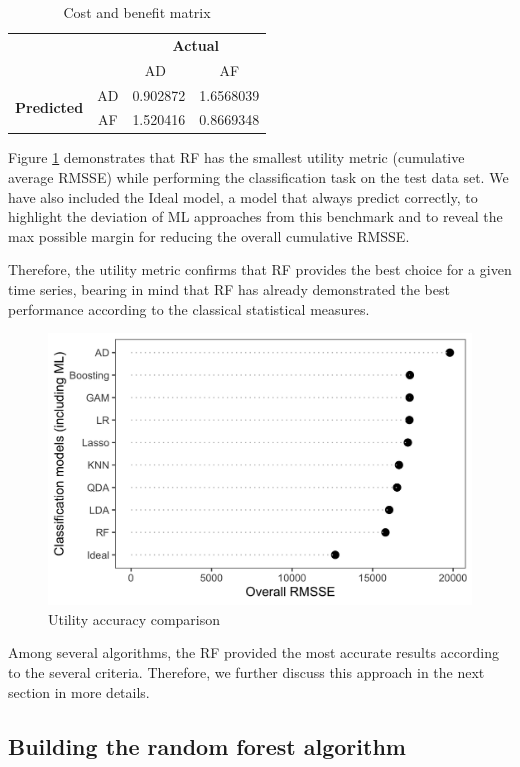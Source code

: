 \documentclass[preprint, 3p,
authoryear]{elsarticle} %
\begin{document}
\begin{table}
\caption{\label{tab:matrix}Cost and benefit matrix}
\centering
\begin{tabular}[t]{lccc}

\multicolumn{2}{c}{} & \multicolumn{2}{c}{\bf Actual}\\ 
\cline{3-4}
& & AD\  & AF\\
\hline
\multirow{2}{4em}{\bf Predicted} & AD & 0.902872 & 1.6568039\\
& AF & 1.520416 & 0.8669348\\
\hline
\end{tabular}
\end{table}

Figure \ref{fig:tableCB} demonstrates that RF has the smallest utility
metric (cumulative average RMSSE) while performing the classification
task on the test data set. We have also included the Ideal model, a
model that always predict correctly, to highlight the deviation of ML
approaches from this benchmark and to reveal the max possible margin for
reducing the overall cumulative RMSSE.

Therefore, the utility metric confirms that RF provides the best choice
for a given time series, bearing in mind that RF has already
demonstrated the best performance according to the classical statistical
measures.

\begin{figure}[H]

{\centering \includegraphics[width=0.6\linewidth]{img/300dpi/utility} 

}

\caption{Utility accuracy comparison}\label{fig:tableCB}
\end{figure}

Among several algorithms, the RF provided the most accurate results
according to the several criteria. Therefore, we further discuss this
approach in the next section in more details.

\hypertarget{building-the-random-forest-algorithm}{%
\subsection{Building the random forest
algorithm}\label{building-the-random-forest-algorithm}}
\end{document}
